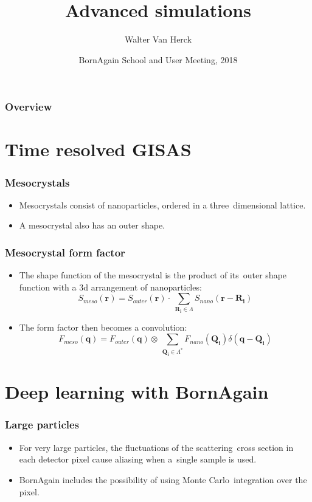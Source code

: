 \documentclass{beamer}
\title{Advanced simulations}
\author
{Walter Van Herck\inst{1}}
\institute[JCNS at MLZ] %
{
  \inst{1}%
  J\"ulich Centre for Neutron Science at MLZ
}
\date[BornAgain] %
{BornAgain School and User Meeting, 2018}
\begin{document}
\frame[plain]{\titlepage}

\begin{frame}
    \frametitle{Overview}
    \tableofcontents
\end{frame}

\section{Time resolved GISAS}

\begin{frame}
    \frametitle{Mesocrystals}
        \begin{itemize}
            \item Mesocrystals consist of nanoparticles, ordered in a three\
                  dimensional lattice.
            \item A mesocrystal also has an outer shape.
        \end{itemize}
\end{frame}

\begin{frame}
    \frametitle{Mesocrystal form factor}
        \begin{itemize}
            \item The shape function of the mesocrystal is the product of its\
                  outer shape function with a 3d arrangement of nanoparticles:
                  \[ S_{meso}(\mathbf r) = S_{outer}(\mathbf r)\cdot \
                  \sum_{\mathbf{R_i}\in\Lambda} S_{nano}\left(\mathbf r - \mathbf{R_i}\right)\]
            \item The form factor then becomes a convolution:
                  \[ F_{meso}(\mathbf q) = F_{outer}(\mathbf q)\otimes \
                  \sum_{\mathbf{Q_i}\in\Lambda^*} F_{nano}(\mathbf{Q_i}) \delta\left(\mathbf q- \mathbf{Q_i}\right)\]
        \end{itemize}
\end{frame}

\section{Deep learning with BornAgain}


\begin{frame}
    \frametitle{Large particles}
    \begin{itemize}
        \item For very large particles, the fluctuations of the scattering\
              cross section in each detector pixel cause aliasing when a\
              single sample is used.
        \item BornAgain includes the possibility of using Monte Carlo\
              integration over the pixel.
    \end{itemize}
\end{frame}
\end{document}
